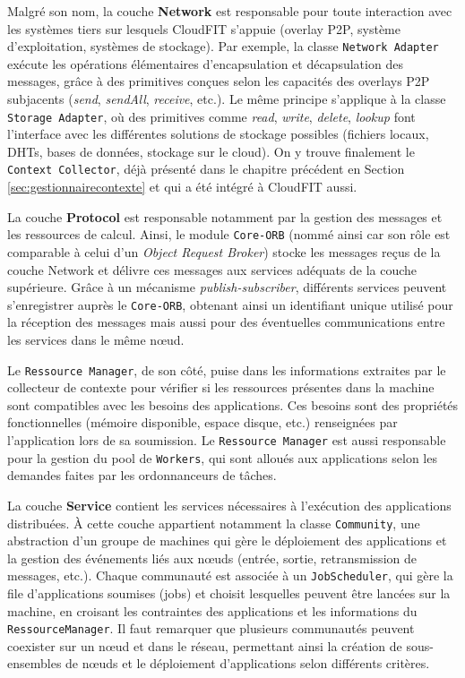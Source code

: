 Malgré son nom, la couche \textbf{Network} est responsable pour toute interaction avec les systèmes tiers sur lesquels CloudFIT s'appuie (overlay P2P, système  d'exploitation, systèmes de stockage). Par exemple, la classe \texttt{Network Adapter} exécute les opérations élémentaires d'encapsulation et décapsulation des messages, grâce à des primitives conçues selon les capacités des overlays P2P subjacents (\textit{send}, \textit{sendAll}, \textit{receive}, etc.). Le même principe s'applique à la classe \texttt{Storage Adapter}, où des primitives comme \textit{read}, \textit{write}, \textit{delete}, \textit{lookup} font l'interface avec les différentes solutions de stockage possibles (fichiers locaux, DHTs, bases de données, stockage sur le cloud). On y trouve finalement le \texttt{Context Collector}, déjà présenté dans le chapitre précédent en Section \ref{sec:gestionnairecontexte} et qui a été intégré à CloudFIT aussi.

La couche \textbf{Protocol} est responsable notamment par la gestion des messages et les ressources de calcul. Ainsi, le module \texttt{Core-ORB} (nommé ainsi car son rôle est comparable à celui d'un \textit{Object Request Broker}) stocke les messages reçus de la couche Network et délivre ces messages aux services adéquats de la couche supérieure. Grâce à un mécanisme \textit{publish-subscriber}, différents services peuvent s'enregistrer auprès le \texttt{Core-ORB}, obtenant ainsi un identifiant unique utilisé pour la réception des messages mais aussi pour des éventuelles communications entre les services dans le même n{\oe}ud. 

Le \texttt{Ressource Manager}, de son côté, puise dans les informations extraites par le collecteur de contexte pour vérifier si les ressources présentes dans la machine sont compatibles avec les besoins des applications. Ces besoins sont des propriétés fonctionnelles (mémoire disponible, espace disque, etc.) renseignées par l'application lors de sa soumission. Le \texttt{Ressource Manager} est aussi responsable pour la gestion du pool de \texttt{Workers}, qui sont alloués aux applications selon les demandes faites par les ordonnanceurs de tâches. 

La couche \textbf{Service}  contient les services nécessaires à l'exécution des applications distribuées. À cette couche appartient notamment la classe \texttt{Community}, une abstraction d'un groupe de machines qui gère le déploiement des applications et la gestion des événements liés aux n{\oe}uds (entrée, sortie, retransmission de messages, etc.). Chaque communauté est associée à un \texttt{JobScheduler}, qui gère la file d'applications soumises (jobs) et choisit lesquelles peuvent être lancées sur la machine, en croisant les contraintes des applications et les informations du \texttt{RessourceManager}.  Il faut remarquer que plusieurs communautés peuvent coexister sur un n{\oe}ud et dans le réseau, permettant ainsi la création de sous-ensembles de n{\oe}uds et le déploiement d'applications selon différents critères.

